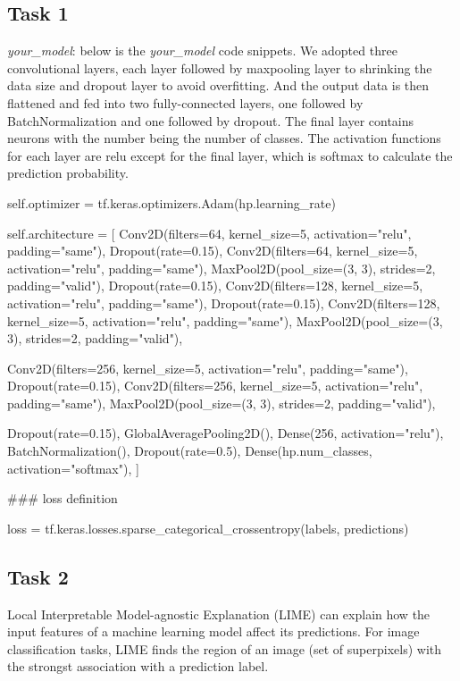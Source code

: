 \subsection*{Task 1}
\emph{your\_model}: below is the \textit{your\_model} code snippets. We adopted three convolutional layers, each layer followed by maxpooling layer to shrinking the data size and dropout layer to avoid overfitting. And the output data is then flattened and fed into two fully-connected layers, one followed by BatchNormalization and one followed by dropout. The final layer contains neurons with the number being the number of classes. The activation functions for each layer are relu except for the final layer, which is softmax to calculate the prediction probability.
          \begin{python}
self.optimizer = tf.keras.optimizers.Adam(hp.learning_rate)

self.architecture = [
    Conv2D(filters=64, kernel_size=5, activation="relu", padding="same"),
    Dropout(rate=0.15),
    Conv2D(filters=64, kernel_size=5, activation="relu", padding="same"),
    MaxPool2D(pool_size=(3, 3), strides=2, padding="valid"),
    Dropout(rate=0.15),
    Conv2D(filters=128, kernel_size=5, activation="relu", padding="same"),
    Dropout(rate=0.15),
    Conv2D(filters=128, kernel_size=5, activation="relu", padding="same"),
    MaxPool2D(pool_size=(3, 3), strides=2, padding="valid"),

    Conv2D(filters=256, kernel_size=5, activation="relu", padding="same"),
    Dropout(rate=0.15),
    Conv2D(filters=256, kernel_size=5, activation="relu", padding="same"),
    MaxPool2D(pool_size=(3, 3), strides=2, padding="valid"),

    Dropout(rate=0.15),
    GlobalAveragePooling2D(),
    Dense(256, activation="relu"),
    BatchNormalization(),
    Dropout(rate=0.5),
    Dense(hp.num_classes, activation="softmax"),
]

### loss definition

loss = tf.keras.losses.sparse_categorical_crossentropy(labels, predictions)
          \end{python}

\subsection*{Task 2}
Local Interpretable Model-agnostic Explanation (LIME) can explain how the input features of a machine learning model affect its predictions. For image classification tasks, LIME finds the region of an image (set of superpixels) with the strongst association with a prediction label.

